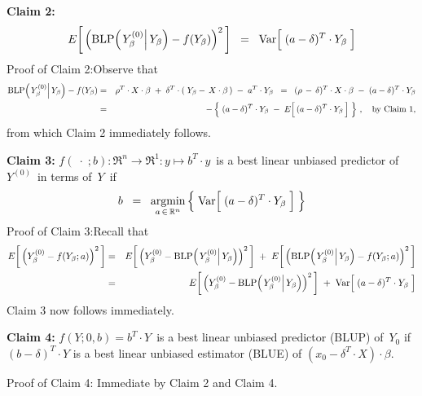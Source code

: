 \begin{enumerate}
	\vskip 0.8cm
	\noindent
	\textbf{Claim 2:}
	\begin{equation*}
	E\!\left[\,\left(\blp\!\left(\left.Y^{(0)}_{\beta}\right\vert Y_{\beta}\right) \overset{{\color{white}.}}{-} f(Y_{\beta})\right)^{2}\,\right]
	\;\; = \;\;
		\Var\!\left[\;(a \overset{{\color{white}.}}{-} \delta)^{T}\cdot Y_{\beta}\;\right]
	\end{equation*}
	Proof of Claim 2:\quad Observe that
	\begin{eqnarray*}
	\blp\!\left(\left.Y^{(0)}_{\beta}\right\vert Y_{\beta}\right) - f(Y_{\beta})
	&=&
		\rho^{T} \cdot X \cdot \beta \; + \; \delta^{T}\cdot(\;Y_{\beta} - \,X\cdot\beta\,) \; - \; a^{T} \cdot Y_{\beta}
	\;\; = \;\;
		(\rho \, - \, \delta)^{T} \cdot X \cdot \beta \; - \; (a - \delta)^{T} \cdot Y_{\beta}
	\\
	&=&
		- \left\{\;
			(a - \delta)^{T} \cdot Y_{\beta} \; - \; E\!\left[\,(a \overset{{\color{white}.}}{-} \delta)^{T} \cdot Y_{\beta}\,\right]
			 \;\right\}\,,
		\quad\textnormal{by Claim 1},
	\end{eqnarray*}
	from which Claim 2 immediately follows.

	\vskip 0.5cm
	\noindent
	\textbf{Claim 3:}\quad
	$f(\;\cdot\;;b) : \Re^{n} \longrightarrow \Re^{1} : y \longmapsto b^{T} \cdot y$\,
	is a best linear unbiased predictor of \,$Y^{(0)}$\, in terms of \,$Y$\, if
	\begin{equation*}
	b \;\; = \;\;
		\underset{a\,\in\,\Re^{n}}{\textnormal{argmin}}
		\left\{\;
			\Var\!\left[\;(a \overset{{\color{white}.}}{-} \delta)^{T}\cdot Y_{\beta}\;\right]
			\;\right\}
	\end{equation*}
	Proof of Claim 3:\quad Recall that
	\begin{eqnarray*}
	E\!\left[\,\left(Y^{(0)}_{\beta} \overset{{\color{white}.}}{-} f(Y_{\beta};a)\right)^{2}\,\right]
	& = &
		E\!\left[\,
			\left(Y^{(0)}_{\beta}
			\overset{{\color{white}.}}{-}
			\blp\!\left(\left.Y^{(0)}_{\beta}\right\vert Y_{\beta}\right)\right)^{2}
			\,\right]
		\; + \;
		E\!\left[\,
			\left(\blp\!\left(\left.Y^{(0)}_{\beta}\right\vert Y_{\beta}\right)
			\overset{{\color{white}.}}{-}
			f(Y_{\beta};a)\right)^{2}
			\,\right]
	\\
	& = &
		E\!\left[\,
			\left(Y^{(0)}_{\beta}
			\overset{{\color{white}.}}{-}
			\blp\!\left(\left.Y^{(0)}_{\beta}\right\vert Y_{\beta}\right)\right)^{2}
			\,\right]
		\; + \;
		\Var\!\left[\;(a \overset{{\color{white}.}}{-} \delta)^{T}\cdot Y_{\beta}\;\right]
	\end{eqnarray*}
	Claim 3 now follows immediately.

	\vskip 0.5cm
	\noindent
	\textbf{Claim 4:}\quad
	$f(Y;0,b) = b^{T}\cdot Y$\, is a best linear unbiased predictor (BLUP) of \,$Y_{0}$ if
	$(b-\delta)^{T} \cdot Y$ is a best linear unbiased estimator (BLUE) of
	$(x_{0} - \delta^{T}\cdot X) \cdot \beta$.

	\vskip 0.2cm
	\noindent
	Proof of Claim 4: \quad Immediate by Claim 2 and Claim 4.
	
\end{enumerate}


